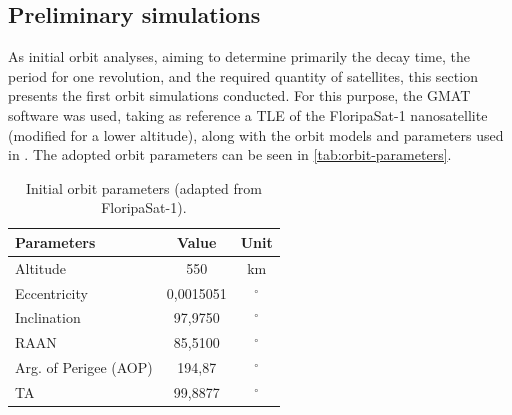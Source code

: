 \subsection{Preliminary simulations}


As initial orbit analyses, aiming to determine primarily the decay time, the period for one revolution, and the required quantity of satellites, this section presents the first orbit simulations conducted. For this purpose, the GMAT software was used, taking as reference a TLE of the FloripaSat-1 nanosatellite \cite{marcelino2021} (modified for a lower altitude), along with the orbit models and parameters used in \cite{marino2016}. The adopted orbit parameters can be seen in \autoref{tab:orbit-parameters}.


\begin{table}[!ht]
    \centering
    \begin{tabular}{lcc}
        \toprule[1.5pt]
        \textbf{Parameters} & \textbf{Value} & \textbf{Unit} \\
        \midrule
        Altitude                & 550           & km \\
        Eccentricity            & 0,0015051     & $^{\circ}$ \\
        Inclination             & 97,9750       & $^{\circ}$ \\
        RAAN                    & 85,5100       & $^{\circ}$ \\
        Arg. of Perigee (AOP)   & 194,87        & $^{\circ}$ \\
        TA                      & 99,8877       & $^{\circ}$ \\
        \bottomrule[1.5pt]
    \end{tabular}
    \caption{Initial orbit parameters (adapted from FloripaSat-1).}
    \label{tab:orbit-parameters}
\end{table}

